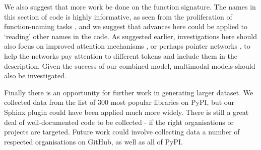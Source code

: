 We also suggest that more work be done on the function signature. The names in this section of code is highly informative, as seen from the proliferation of function-naming tasks \citep{allamanis_convolutional_2016,allamanis_learning_2017}, and we suggest that advances here could be applied to `reading' other names in the code. As suggested earlier, investigations here should also focus on improved attention mechanisms \citep{niculae_regularized_2017}, or perhaps pointer networks \citep{NIPS2015_5866}, to help the networks pay attention to different tokens and include them in the description. Given the success of our combined model, multimodal models should also be investigated.

Finally there is an opportunity for further work in generating larger dataset. We collected data from the list of 300 most popular libraries on PyPI, but our Sphinx plugin could have been applied much more widely. There is still a great deal of well-documented code to be collected - if the right organisations or projects are targeted. Future work could involve collecting data a number of respected organisations on GitHub, as well as all of PyPI.














